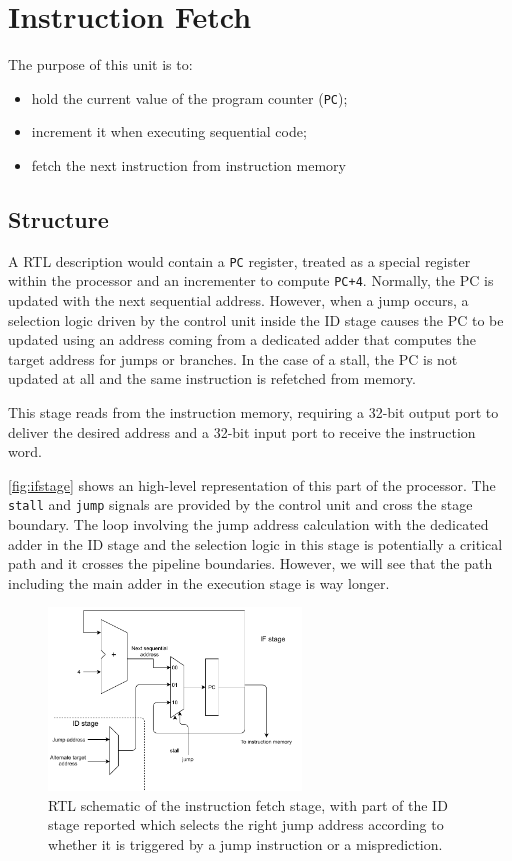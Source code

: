 \section{Instruction Fetch}
The purpose of this unit is to:
\begin{itemize}
	\item hold the current value of the program counter (\texttt{PC}); 
	\item increment it when executing sequential code;
	\item fetch the next instruction from instruction memory
\end{itemize}

\subsection{Structure} A RTL description would contain a \texttt{PC} register, treated as a special register within the processor and an incrementer to compute \texttt{PC+4}. Normally, the PC is updated with the next sequential address. However, when a jump occurs, a selection logic driven by the control unit inside the ID stage causes the PC to be updated using an address coming from a dedicated adder that computes the target address for jumps or branches. In the case of a stall, the PC is not updated at all and the same instruction is refetched from memory.

This stage reads from the instruction memory, requiring a 32-bit output port to deliver the desired address and a 32-bit input port to receive the instruction word. 

\autoref{fig:ifstage} shows an high-level representation of this part of the processor. The \texttt{stall} and \texttt{jump} signals are provided by the control unit and cross the stage boundary. The loop involving the jump address calculation with the dedicated adder in the ID stage and the selection logic in this stage is potentially a critical path and it crosses the pipeline boundaries. However, we will see that the path including the main adder in the execution stage is way longer.

\begin{figure}[h]
	\centering
	\includegraphics[width=0.6\textwidth]{../images/IF.pdf}
	\caption{RTL schematic of the instruction fetch stage, with part of the ID stage reported which selects the right jump address according to whether it is triggered by a jump instruction or a misprediction.}
	\label{fig:ifstage}
\end{figure}